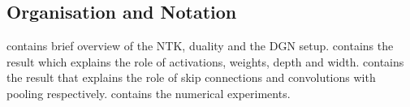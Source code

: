 \subsection{Organisation and Notation}
 contains brief overview of the NTK, duality and the DGN setup.  contains the result which explains the role of activations, weights, depth and width.  contains the result that explains the role of skip connections and convolutions with pooling respectively.  contains the numerical experiments.

